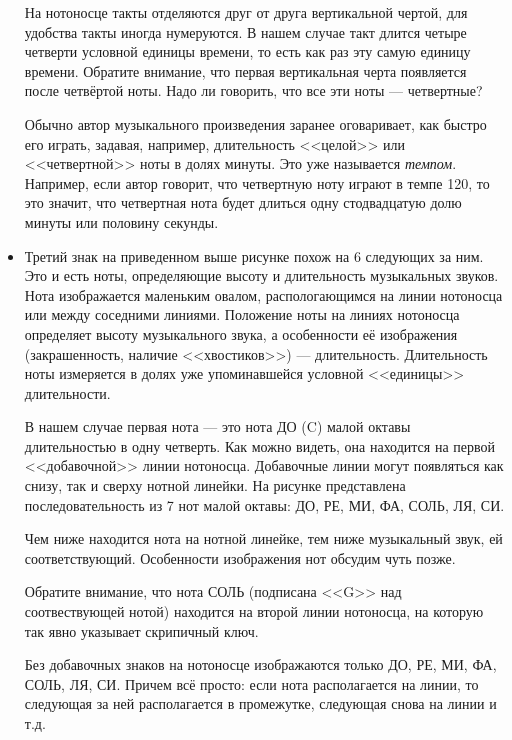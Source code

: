 \begin{itemize}
    На нотоносце такты отделяются друг от друга вертикальной чертой, для удобства такты иногда нумеруются. В нашем случае такт длится четыре четверти условной единицы времени, то есть как раз эту самую единицу времени. Обратите внимание, что первая вертикальная черта появляется после четвёртой ноты. Надо ли говорить, что все эти ноты --- четвертные?
    
    Обычно автор музыкального произведения заранее оговаривает, как быстро его играть, задавая, например, длительность <<целой>> или <<четвертной>> ноты в долях минуты. Это уже называется \emph{темпом}. Например, если автор говорит, что четвертную ноту играют в темпе 120, то это значит, что четвертная нота будет длиться одну стодвадцатую долю минуты или половину секунды.
    
    \item Третий знак на приведенном выше рисунке похож на 6 следующих за ним. Это и есть ноты, определяющие высоту и длительность музыкальных звуков. Нота изображается маленьким овалом, распологающимся на линии нотоносца или между соседними линиями. Положение ноты на линиях нотоносца определяет высоту музыкального звука, а особенности её изображения (закрашенность, наличие <<хвостиков>>) --- длительность. Длительность ноты измеряется в долях уже упоминавшейся условной <<единицы>> длительности.
    
    В нашем случае первая нота --- это нота ДО (C) малой октавы длительностью в одну четверть. Как можно видеть, она находится на первой <<добавочной>> линии нотоносца. Добавочные линии могут появляться как снизу, так и сверху нотной линейки. На рисунке представлена последовательность из 7 нот малой октавы: ДО, РЕ, МИ, ФА, СОЛЬ, ЛЯ, СИ.
    
    Чем ниже находится нота на нотной линейке, тем ниже музыкальный звук, ей соответствующий. Особенности изображения нот обсудим чуть позже.
        
    Обратите внимание, что нота СОЛЬ (подписана <<G>> над соотвествующей нотой) находится на второй линии нотоносца, на которую так явно указывает скрипичный ключ.
    
    Без добавочных знаков на нотоносце изображаются только ДО, РЕ, МИ, ФА, СОЛЬ, ЛЯ, СИ. Причем всё просто: если нота располагается на линии, то следующая за ней располагается в промежутке, следующая снова на линии и т.д.
\end{itemize}

